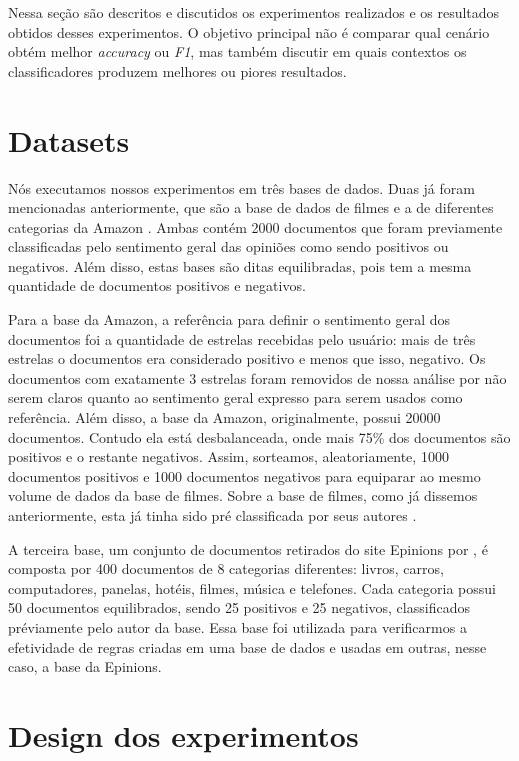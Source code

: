 
Nessa seção são descritos e discutidos os experimentos realizados e os resultados obtidos desses experimentos. O objetivo principal não é comparar qual cenário obtém melhor \textit{accuracy} ou \textit{F1}, mas também discutir em quais contextos os classificadores produzem melhores ou piores resultados.

\section{Datasets}

Nós executamos nossos experimentos em três bases de dados. Duas já foram mencionadas anteriormente, que são a base de dados de filmes \cite{pang2004sentimental} e a de diferentes categorias da Amazon \cite{wang2011latent}. Ambas contém 2000 documentos que foram previamente classificadas pelo sentimento geral das opiniões como sendo positivos ou negativos. Além disso, estas bases são ditas equilibradas, pois tem a mesma quantidade de documentos positivos e negativos. 

Para a base da Amazon, a referência para definir o sentimento geral dos documentos foi a quantidade de estrelas recebidas pelo usuário: mais de três estrelas o documentos era considerado positivo e menos que isso, negativo. Os documentos com exatamente 3 estrelas foram removidos de nossa análise por não serem claros quanto ao sentimento geral expresso para serem usados como referência. Além disso, a base da Amazon, originalmente, possui 20000 documentos. Contudo ela está  desbalanceada, onde mais 75\% dos documentos são positivos e o restante negativos. Assim, sorteamos, aleatoriamente, 1000 documentos positivos e 1000 documentos negativos para equiparar ao mesmo volume de dados da base de filmes. Sobre a base de filmes, como já dissemos anteriormente, esta já tinha sido pré classificada por seus autores \cite{pang2004sentimental}.

A terceira base, um conjunto de documentos retirados do site Epinions por \cite{taboada2011lexicon}, é composta por 400 documentos de 8 categorias diferentes: livros, carros, computadores, panelas, hotéis, filmes, música e telefones. Cada categoria possui 50 documentos equilibrados, sendo 25 positivos e 25 negativos, classificados préviamente pelo autor da base. Essa base foi utilizada para verificarmos a efetividade de regras criadas em uma base de dados e usadas em outras, nesse caso, a base da Epinions. 

\section{Design dos experimentos}

